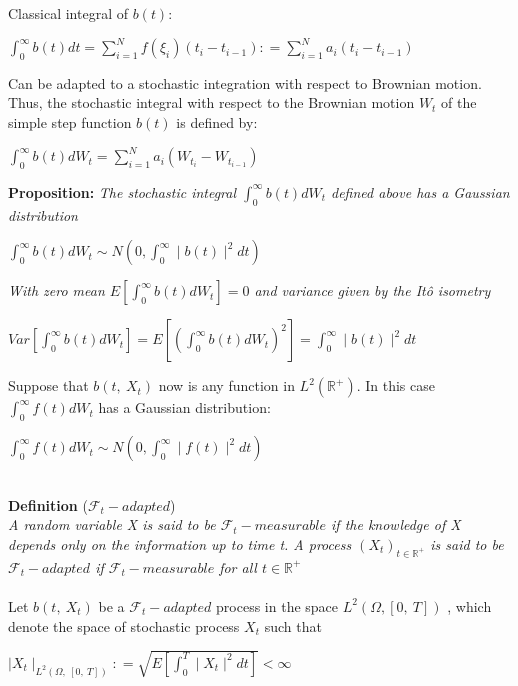 \documentclass{article}
\begin{document}
\noindent
Classical integral of $b\left( t\right)$:
\begin{center}
	$\int^{\infty }_{0} b\left( t\right)  dt=\sum^{N}_{i=1} f\left( \xi_{i} \right)  \left( t_{i}-t_{i-1}\right)  \colon =\sum^{N}_{i=1} a_{i}\left( t_{i}-t_{i-1}\right)  $
\end{center}
\noindent
Can be adapted to a stochastic integration with respect to Brownian motion.
\\
Thus, the stochastic integral with respect to the Brownian motion $W_{t}$ of the simple step function $b\left( t\right)  $ is defined by:
\begin{center}
	$\int^{\infty }_{0} b\left( t\right)  dW_{t}=\sum^{N}_{i=1} a_{i}\left( W_{t_{i}}-W_{t_{i-1}}\right)  $
\end{center}

\noindent
\textbf{Proposition:} \textit{The stochastic integral $\int^{\infty }_{0} b\left( t\right)  dW_{t}$ defined above has a Gaussian distribution}
\begin{center}
	$\int^{\infty }_{0} b\left( t\right)  dW_{t}\sim N\left( 0,\int^{\infty }_{0} \mid b\left( t\right)  \mid^{2} dt\right)  $
\end{center}
\textit{With zero mean $E[\int^{\infty }_{0} b\left( t\right)  dW_{t}]=0$ and variance given by the It\^{o} isometry}
\begin{center}
	$Var\left[ \int^{\infty }_{0} b\left( t\right)  dW_{t}\right]  =E\left[ \left( \int^{\infty }_{0} b\left( t\right)  dW_{t}\right)^{2}  \right]  =\int^{\infty }_{0} \mid b\left( t\right)  \mid^{2} dt$
\end{center}
Suppose that $b\left( t,\  X_{t}\right)  $ now is any function in $L^{2}\left( \mathbb{R}^{+} \right).  $ In this case $\int^{\infty }_{0} f\left( t\right)  dW_{t}$ has a Gaussian distribution:
\begin{center}
	$\int^{\infty }_{0} f\left( t\right)  dW_{t}\sim N\left( 0,\int^{\infty }_{0} \mid f\left( t\right)  \mid^{2} dt\right)  $
\end{center}
~\\
\textbf{Definition} ($\mathscr{F}_{t} -adapted$)
\\
\textit{A random variable X is said to be $\mathscr{F}_{t} -measurable$ if the knowledge of X depends only on the information up to time t. A process $(X_{t})_{t\in \mathbb{R}^{+} }$ is said to be $\mathscr{F}_{t} -adapted$ if $\mathscr{F}_{t} -measurable$ for all $t\in \mathbb{R}^{+} $}
~\\
~\\
Let $b\left( t,\  X_{t}\right)  $ be a $\mathscr{F}_{t} -adapted$ process in the space $L^{2}\left( \Omega ,\left[ 0,\  T\right]  \right)  $ , which denote the space of stochastic process $X_{t}$ such that 
\begin{center}
	$\mid X_{t}\mid_{L^{2}\left( \Omega ,\  \left[ 0,\  T\right]  \right)  } \colon =\sqrt{E\left[ \int^{T}_{0} \mid X_{t}\mid^{2} dt\right]  } <\infty $
\end{center}
\end{document}
